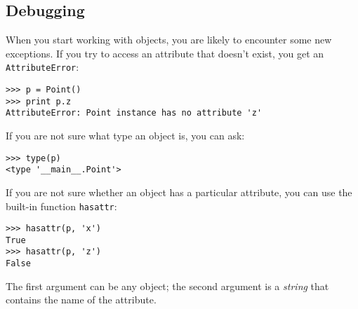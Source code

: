 \documentclass{article}
\begin{document}
\begin{multicols}{2}
\subsection{Debugging}
When you start working with objects, you are likely to encounter some new
exceptions. If you try to access an attribute that doesn’t exist, you get
an \verb|AttributeError|:
\begin{verbatim}
>>> p = Point()
>>> print p.z
AttributeError: Point instance has no attribute 'z'
\end{verbatim}
If you are not sure what type an object is, you can ask:
\begin{verbatim}
>>> type(p)
<type '__main__.Point'>
\end{verbatim}
If you are not sure whether an object has a particular attribute, you can
use the built-in function \verb|hasattr|:
\begin{verbatim}
>>> hasattr(p, 'x')
True
>>> hasattr(p, 'z')
False
\end{verbatim}
The first argument can be any object; the second argument is a
\emph{string} that contains the name of the attribute.
\end{multicols}

\newpage  %
\end{document}
